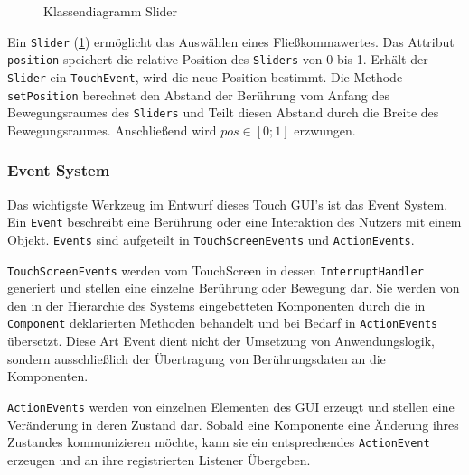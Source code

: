 		\medskip
		\begin{figure}
			\caption{Klassendiagramm Slider}
			\label{uml-slider}
		\end{figure}
		Ein \texttt{Slider} (\ref{uml-slider}) ermöglicht das Auswählen eines Fließkommawertes.
		Das Attribut \texttt{position} speichert die relative Position des \texttt{Sliders} von 0 bis 1.
		Erhält der \texttt{Slider} ein \texttt{TouchEvent}, wird die neue Position bestimmt.
		Die Methode \texttt{setPosition} berechnet den Abstand der Berührung vom Anfang des Bewegungsraumes des \texttt{Sliders}
		und Teilt diesen Abstand durch die Breite des Bewegungsraumes. Anschließend wird $pos \in [0; 1]$ erzwungen.
		
	\subsubsection{Event System}\label{sec:EventSystem}
		Das wichtigste Werkzeug im Entwurf dieses Touch GUI's ist das Event System.
		Ein \texttt{Event} beschreibt eine Berührung oder eine Interaktion des Nutzers mit einem Objekt.
		\texttt{Events} sind aufgeteilt in \texttt{TouchScreenEvents} und \texttt{ActionEvents}.

		\texttt{TouchScreenEvents} werden vom TouchScreen in dessen \texttt{InterruptHandler} generiert und stellen eine einzelne Berührung oder Bewegung dar.
		Sie werden von den in der Hierarchie des Systems eingebetteten Komponenten durch die in \texttt{Component} deklarierten Methoden behandelt
		und bei Bedarf in \texttt{ActionEvents} übersetzt.
		Diese Art Event dient nicht der Umsetzung von Anwendungslogik, sondern ausschließlich der Übertragung von Berührungsdaten an die Komponenten.
		
		\texttt{ActionEvents} werden von einzelnen Elementen des GUI erzeugt und stellen eine Veränderung in deren Zustand dar.
		Sobald eine Komponente eine Änderung ihres Zustandes kommunizieren möchte, kann sie ein entsprechendes \texttt{ActionEvent} erzeugen
		und an ihre registrierten Listener Übergeben.
		
		